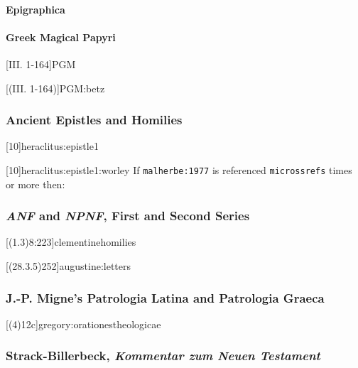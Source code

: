 \documentclass[a4paper]{article}
\begin{document}
\paragraph{Epigraphica}

\paragraph{Greek Magical Papyri}

[III. 1-164]{PGM}

[(III. 1-164)]{PGM:betz}

\subsubsection{Ancient Epistles and Homilies}

[10]{heraclitus:epistle1}

[10]{heraclitus:epistle1:worley}
If \texttt{malherbe:1977} is referenced \texttt{microssrefs} times or more
then:\par
{}

\subsubsection{\emph{ANF} and \emph{NPNF}, First and Second Series}

[(1.3)8:223]{clementinehomilies}

[(28.3.5)252]{augustine:letters}

\subsubsection{J.-P. Migne's Patrologia Latina and Patrologia Graeca}

[(4)12c]{gregory:orationestheologicae}

\subsubsection{Strack-Billerbeck, \emph{Kommentar zum Neuen Testament}}
\end{document}
